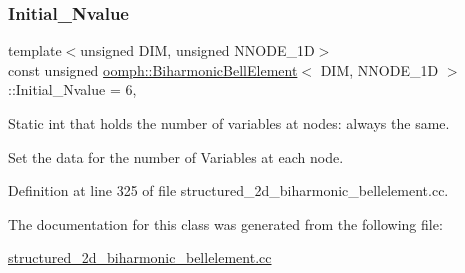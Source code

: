 \subsubsection{\texorpdfstring{Initial\+\_\+\+Nvalue}{Initial\_Nvalue}}
{\footnotesize\ttfamily template$<$unsigned D\+IM, unsigned N\+N\+O\+D\+E\+\_\+1D$>$ \\
const unsigned \hyperlink{classoomph_1_1BiharmonicBellElement}{oomph\+::\+Biharmonic\+Bell\+Element}$<$ D\+IM, N\+N\+O\+D\+E\+\_\+1D $>$\+::Initial\+\_\+\+Nvalue = 6\hspace{0.3cm}{\ttfamily [static]}, {\ttfamily [private]}}



Static int that holds the number of variables at nodes\+: always the same. 

Set the data for the number of Variables at each node. 

Definition at line 325 of file structured\+\_\+2d\+\_\+biharmonic\+\_\+bellelement.\+cc.



The documentation for this class was generated from the following file\+:\begin{DoxyCompactItemize}
\item 
\hyperlink{structured__2d__biharmonic__bellelement_8cc}{structured\+\_\+2d\+\_\+biharmonic\+\_\+bellelement.\+cc}\end{DoxyCompactItemize}
